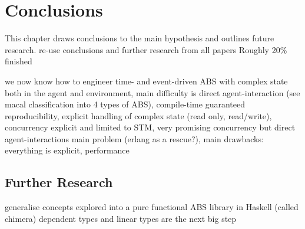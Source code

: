 \chapter{Conclusions}

This chapter draws conclusions to the main hypothesis and outlines future research.
re-use conclusions and further research from all papers
Roughly 20\% finished

we now know how to engineer time- and event-driven ABS with complex state both in the agent and environment, main difficulty is direct agent-interaction (see macal classification into 4 types of ABS), compile-time guaranteed reproducibility, explicit handling of complex state (read only, read/write), concurrency explicit and limited to STM, very promising concurrency but direct agent-interactions main problem (erlang as a rescue?), main drawbacks: everything is explicit, performance

\section{Further Research}
generalise concepts explored into a pure functional ABS library in Haskell (called chimera)
dependent types and linear types are the next big step